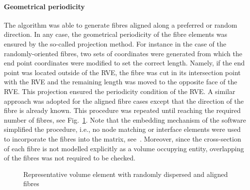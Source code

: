 	\paragraph{Geometrical periodicity} The algorithm was able to generate fibres aligned along a preferred or random direction. In any case, the geometrical periodicity of the fibre elements was ensured by the so-called projection method. For instance in the case of the randomly-oriented fibres, two sets of coordinates were generated from which the end point coordinates were modified to set the correct length. Namely, if the end point was located outside of the RVE, the fibre was cut in its intersection point with the RVE and the remaining length was moved to the opposite face of the RVE. This projection ensured the periodicity condition of the RVE. A similar approach was adopted for the aligned fibre cases except that the direction of the fibre is already known. This procedure was repeated until reaching the required number of fibres, see Fig.~\ref{figure:mesh}. Note that the embedding mechanism of the software simplified the procedure, i.e., no node matching or interface elements were used to incorporate the fibres into the matrix, see~\autocite{marc.a}. Moreover, since the cross-section of each fibre is not modelled explicitly as a volume occupying entity, overlapping of the fibres was not required to be checked.

	\begin{figure}[!h]
	\centering
	  	\hfill
	  	\hfill
	\caption{Representative volume element with randomly dispersed and aligned fibres}\label{figure:mesh}
	\end{figure}
	
